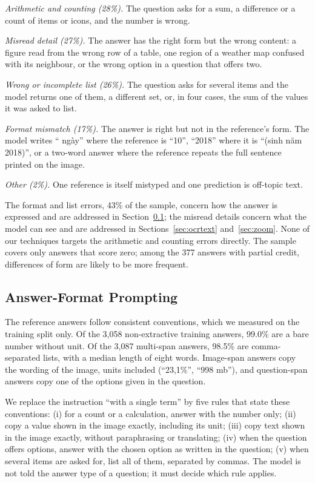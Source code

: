 \documentclass[conference]{IEEEtran}
\newcommand{\vi}[1]{{\fontencoding{T5}\selectfont #1}}
\newcommand{\vi}[1]{#1}
\begin{document}
\emph{Arithmetic and counting (28\%).} The question asks for a sum, a difference or a count of items or icons, and the number is wrong.

\emph{Misread detail (27\%).} The answer has the right form but the wrong content: a figure read from the wrong row of a table, one region of a weather map confused with its neighbour, or the wrong option in a question that offers two.

\emph{Wrong or incomplete list (26\%).} The question asks for several items and the model returns one of them, a different set, or, in four cases, the sum of the values it was asked to list.

\emph{Format mismatch (17\%).} The answer is right but not in the reference's form. The model writes ``\vi{10 ngày}'' where the reference is ``10'', ``2018'' where it is ``\vi{(sinh năm 2018)}'', or a two-word answer where the reference repeats the full sentence printed on the image.

\emph{Other (2\%).} One reference is itself mistyped and one prediction is off-topic text.

The format and list errors, 43\% of the sample, concern how the answer is expressed and are addressed in Section~\ref{sec:format}; the misread details concern what the model can see and are addressed in Sections~\ref{sec:ocrtext} and~\ref{sec:zoom}. None of our techniques targets the arithmetic and counting errors directly. The sample covers only answers that score zero; among the 377 answers with partial credit, differences of form are likely to be more frequent.

\subsection{Answer-Format Prompting}
\label{sec:format}
The reference answers follow consistent conventions, which we measured on the training split only. Of the 3{,}058 non-extractive training answers, 99.0\% are a bare number without unit. Of the 3{,}087 multi-span answers, 98.5\% are comma-separated lists, with a median length of eight words. Image-span answers copy the wording of the image, units included (``23,1\%'', ``998 mb''), and question-span answers copy one of the options given in the question.

We replace the instruction ``with a single term'' by five rules that state these conventions: (i) for a count or a calculation, answer with the number only; (ii) copy a value shown in the image exactly, including its unit; (iii) copy text shown in the image exactly, without paraphrasing or translating; (iv) when the question offers options, answer with the chosen option as written in the question; (v) when several items are asked for, list all of them, separated by commas. The model is not told the answer type of a question; it must decide which rule applies.
\end{document}
